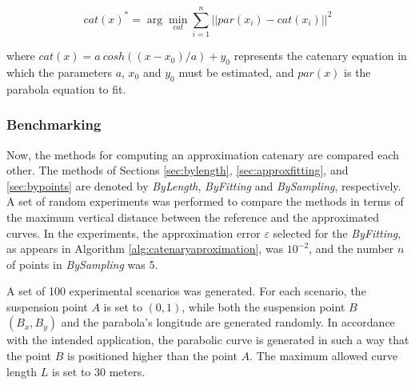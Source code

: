 \begin{equation}
     cat(x)^*=\arg \min_{cat} \sum_{i=1}^n ||par(x_i) - cat(x_i)||^2
\end{equation}


\noindent where $cat(x)=a\ cosh( (x-x_0)/a) + y_0$ represents the catenary equation in which the parameters $a$, $x_0$ and $y_0$ must be estimated, and $par(x)$ is the parabola equation to fit.



\subsubsection{Benchmarking}

Now, the methods for computing an approximation catenary are compared each other. The methods of Sections \ref{sec:bylength}, \ref{sec:approxfitting}, and \ref{sec:bypoints} are denoted by \emph{ByLength}, \emph{ByFitting} and \emph{BySampling}, respectively.
A set of random experiments was performed to compare the methods in terms of the maximum vertical distance between the reference and the approximated curves. In the experiments, the approximation error $\varepsilon$ selected for the \emph{ByFitting}, as appears in Algorithm \ref{alg:catenaryaproximation}, was $10^{-2}$, and the number $n$ of points in \emph{BySampling} was 5.

\begin{comment}
\begin{figure}[t!]
    \centering
    \texttt{[image: Figures/approx\_curves.png]}
    \caption{Approximation catenaries by the three methods.
    }
    \label{fig:approx_cat}
\end{figure}
\end{comment}

A set of 100 experimental scenarios was generated. For each scenario, the suspension point $A$ is set to $(0,1)$, while both the suspension point $B$ $(B_x,B_y)$ and the parabola's longitude are generated randomly. In accordance with the intended application, the parabolic curve is generated in such a way that the point $B$ is positioned higher than the point $A$. The maximum allowed curve length $L$ is set to $30$ meters.

